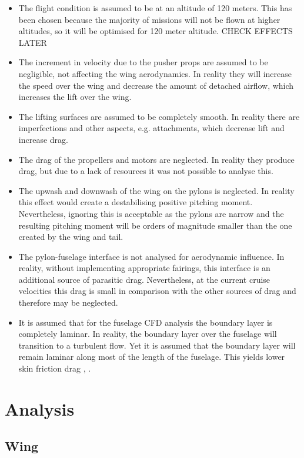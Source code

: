 \begin{itemize}
    \item The flight condition is assumed to be at an altitude of 120 meters. This has been chosen because the majority of missions will not be flown at higher altitudes, so it will be optimised for 120 meter altitude. CHECK EFFECTS LATER
    \item The increment in velocity due to the pusher props are assumed to be negligible, not affecting the wing aerodynamics. In reality they will increase the speed over the wing and decrease the amount of detached airflow, which increases the lift over the wing.
    \item The lifting surfaces are assumed to be completely smooth. In reality there are imperfections and other aspects, e.g. attachments, which decrease lift and increase drag.
    \item The drag of the propellers and motors are neglected. In reality they produce drag, but due to a lack of resources it was not possible to analyse this.
    \item The upwash and downwash of the wing on the pylons is neglected. In reality this effect would create a destabilising positive pitching moment. Nevertheless, ignoring this is acceptable as the pylons are narrow and the resulting pitching moment will be orders of magnitude smaller than the one created by the wing and tail.
    \item The pylon-fuselage interface is not analysed for aerodynamic influence. In reality, without implementing appropriate fairings, this interface is an additional source of parasitic drag. Nevertheless, at the current cruise velocities this drag is small in comparison with the other sources of drag and therefore may be neglected.
    \item It is assumed that for the fuselage CFD analysis the boundary layer is completely laminar. In reality, the boundary layer over the fuselage will transition to a turbulent flow. Yet it is assumed that the boundary layer will remain laminar along most of the length of the fuselage. This yields lower skin friction drag \cite[75]{anderson}, \cite[170]{fluidmech}.
\end{itemize}

\section{Analysis}

\subsection{Wing}

